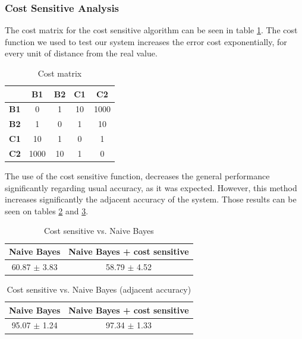 \documentclass{acm_proc_article-sp}
\begin{document}
\subsubsection{Cost Sensitive Analysis}
The cost matrix for the cost sensitive algorithm can be seen in table \ref{tab:kostuMatrizea}. The cost function we used to test our system increases the error cost exponentially, for every unit of distance from the real value.
\begin{table}
 \begin{center}
 \begin{tabular}{|c|c|c|c|c|}\hline

     & {\bf B1} &  {\bf B2} &  {\bf C1} & {\bf C2 }  \\ \hline
{\bf B1}	  &  0   &  1 & 10    &   1000       \\ \hline
{\bf B2}   &       1 & 0  &  1   &   10     \\ \hline
{\bf C1	}   &      10  &  1 &  0  &  1    \\ \hline
{\bf C2	}     &    1000  &  10 &   1  & 0      \\ \hline
  
 \end{tabular}
 \end{center}
 \caption{Cost matrix}
 \label{tab:kostuMatrizea}
\end{table}  

The use of the cost sensitive function, decreases the general performance significantly regarding usual accuracy, as it was expected. However, this method increases significantly the adjacent accuracy of the system. Those results can be seen on tables \ref{tab:costsensitivettest} and \ref{tab:costsensitivettestadjacent}.

\begin{table}
 \begin{center}
 \begin{tabular}{|c|c|}\hline
	        Naive Bayes   & Naive Bayes + cost sensitive    \\ \hline
 				60.87 $\pm$ 3.83  &   58.79 $\pm$ 4.52 \\ \hline
 \end{tabular}
 \end{center}
 \caption{Cost sensitive vs. Naive Bayes }
 \label{tab:costsensitivettest}
\end{table} 


\begin{table}
 \begin{center}
 \begin{tabular}{|c|c|}\hline
	        Naive Bayes   & Naive Bayes + cost sensitive    \\ \hline
 				95.07 $\pm$ 1.24  &   97.34 $\pm$ 1.33 \\ \hline
 \end{tabular}
 \end{center}
 \caption{Cost sensitive vs. Naive Bayes (adjacent accuracy)}
 \label{tab:costsensitivettestadjacent}
\end{table} 
\end{document}
